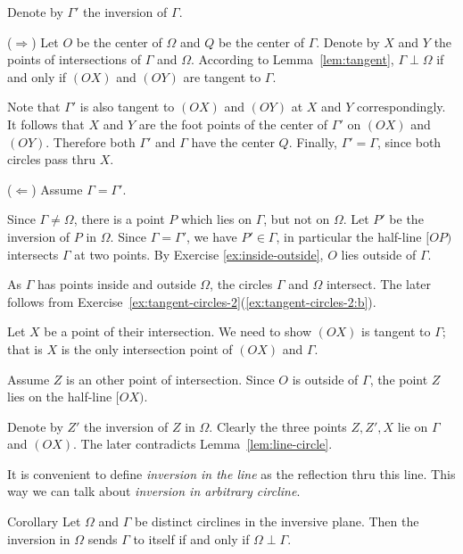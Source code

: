 Denote by $\Gamma'$ the inversion of $\Gamma$.

\parit{}($\Rightarrow$)
Let $O$ be the center of $\Omega$
and $Q$ be the center of $\Gamma$.
Denote by $X$ and $Y$ the points of intersections of  $\Gamma$ and $\Omega$.
According to Lemma~\ref{lem:tangent}, $\Gamma\perp\Omega$ if and only if $(OX)$ and $(OY)$ are tangent to $\Gamma$.

Note that $\Gamma'$ is also tangent to $(OX)$ and $(OY)$ at $X$ and $Y$ correspondingly. 
It follows that $X$ and $Y$ are the foot points of the center of $\Gamma'$ on $(OX)$ and $(OY)$.
Therefore both $\Gamma'$ and $\Gamma$ have the center $Q$.
Finally, $\Gamma'=\Gamma$, since both circles pass thru $X$.

\parit{}($\Leftarrow$)
Assume $\Gamma=\Gamma'$.

Since $\Gamma\ne \Omega$, there is a point $P$ which lies on $\Gamma$, but not on $\Omega$.
Let $P'$ be the inversion of $P$ in $\Omega$.
Since $\Gamma=\Gamma'$, we have $P'\in \Gamma$,
in particular the half-line $[OP)$ intersects $\Gamma$ at two points.
By Exercise \ref{ex:inside-outside}, 
 $O$ lies outside of $\Gamma$.

As $\Gamma$ has points inside and outside $\Omega$,
the circles $\Gamma$ and $\Omega$ intersect.
The later follows from Exercise~\ref{ex:tangent-circles-2}(\ref{ex:tangent-circles-2:b}).

Let $X$ be a point of their intersection.
We need to show $(OX)$ is tangent to $\Gamma$;
that is $X$ is the only intersection point of $(OX)$ and $\Gamma$.

Assume $Z$ is an other point of intersection.
Since $O$ is outside of $\Gamma$, 
the point $Z$ lies on the half-line $[OX)$.

Denote by $Z'$ the inversion of $Z$ in $\Omega$.
Clearly the three points $Z, Z', X$ lie on $\Gamma$ and $(OX)$.
The later  contradicts Lemma~\ref{lem:line-circle}.
\qeds 

It is convenient to define 
\emph{inversion in the line}
as the reflection thru this line.
This way we can talk about \emph{inversion in arbitrary circline}.


\begin{thm}{Corollary}\label{cor:perp-inverse-clines}
Let $\Omega$  and $\Gamma$ be distinct circlines in the inversive plane.
Then
the inversion in $\Omega$ sends $\Gamma$ to itself if and only if $\Omega\perp\Gamma$.
\end{thm}

